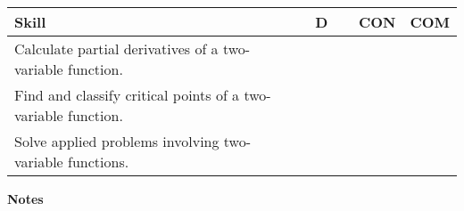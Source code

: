 \documentclass[10pt]{book}
\theoremstyle{definition}
\theoremstyle{remark}
\begin{document}
\begin{large}
\begin{center}
\begin{tabular}{|l|l|l|l|}
\hline
\textbf{Skill} & \textbf{~~D~~} & \textbf{CON} & \textbf{COM} \\
\hline
Calculate partial derivatives of a two-variable function.&&&\\
\hline
Find and classify critical points of a two-variable function.&&&\\
\hline
Solve applied problems involving two-variable functions.&&&\\
\hline
\end{tabular}
\end{center}
\vfil

\noindent
\textbf{Notes}
\end{large} \vfil
\newpage
\end{document}
